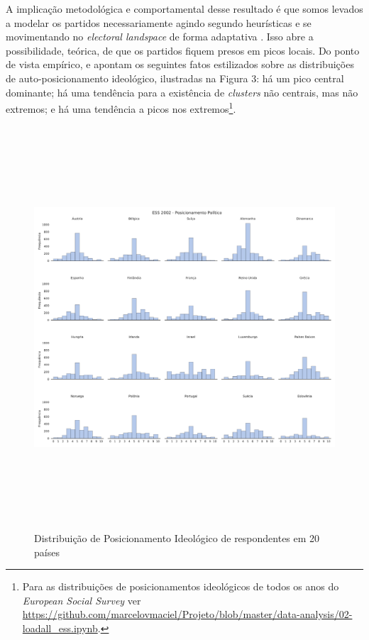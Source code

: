 A implicação metodológica e comportamental desse resultado é que somos levados a
modelar os partidos necessariamente agindo segundo heurísticas e se movimentando
no \textit{electoral landspace} de forma adaptativa \cite{kollman1998political,
  de1999adaptive}. Isso abre a possibilidade, teórica, de que os partidos fiquem
presos em picos locais. Do ponto de vista empírico,
 e  apontam os seguintes
fatos estilizados sobre as distribuições de auto-posicionamento ideológico,
ilustradas na Figura 3: há um pico central dominante; há uma tendência para a
existência de \textit{clusters} não centrais, mas não extremos; e há uma
tendência a picos nos extremos\footnote{Para as distribuições de posicionamentos
  ideológicos de todos os anos do \textit{European Social Survey} ver
  \url{https://github.com/marcelovmaciel/Projeto/blob/master/data-analysis/02-loadall_ess.ipynb}.}.

\begin{figure}[H]
  \centering \includegraphics[width= \textwidth, height = 15cm]{ims/ess_2002_plots.pdf}
  \caption{Distribuição de Posicionamento Ideológico de respondentes em 20 países}
\end{figure}

